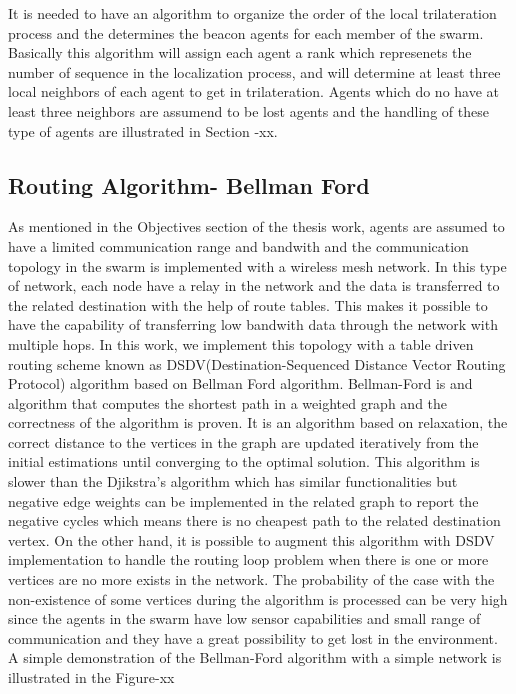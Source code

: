\documentclass[twoside]{article}
\begin{document}
	It is needed to have an algorithm to organize the order of the local trilateration process and the determines the beacon agents for each member of the swarm. Basically this algorithm will assign each agent a rank which represenets the number of sequence in the localization process, and will determine at least three local neighbors of each agent to get in trilateration. Agents which do no have at least three neighbors are assumend to be lost agents and the handling of these type of agents are illustrated in Section -xx.
	
	\subsection{Routing Algorithm- Bellman Ford}
	As mentioned in the Objectives section of the thesis work, agents are assumed to have a limited communication range and bandwith and the communication topology in the swarm is implemented with a wireless mesh network. In this type of network, each node have a relay in the network and the data is transferred to the related destination with the help of route tables. This makes it possible to have the capability of transferring low bandwith data through the network with multiple hops.  In this work, we implement this topology with a table driven routing scheme known as DSDV(Destination-Sequenced Distance Vector Routing Protocol) algorithm based on Bellman Ford algorithm. Bellman-Ford is and algorithm that computes the shortest path in a weighted graph and the correctness of the algorithm is proven. It is an algorithm based on relaxation, the correct distance to the vertices in the graph are updated iteratively from the initial estimations until converging to the optimal solution. This algorithm is slower than the Djikstra's algorithm which has similar functionalities but negative edge weights can be implemented in the related graph to report the negative cycles which means there is no cheapest path to the related destination vertex. On the other hand, it is possible to augment this algorithm with DSDV implementation to handle the routing loop problem when there is one or more vertices are no more exists in the network. The probability of the case with the non-existence of some vertices during the algorithm is processed can be very high since the agents in the swarm have low sensor capabilities and small range of communication and they have a great possibility to get lost in the environment. A simple demonstration of the Bellman-Ford algorithm with a simple network is illustrated in the Figure-xx
	
\end{document}
